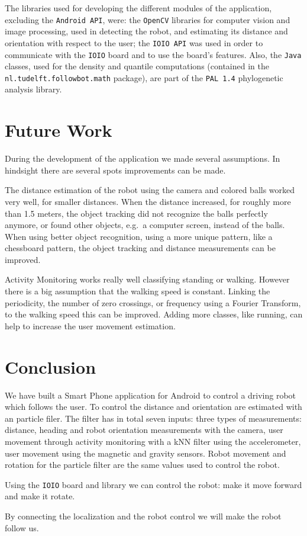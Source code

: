 \documentclass[journal]{IEEEtran}
\begin{document}
The libraries used for developing the different modules of the application, excluding the \texttt{Android API}, were: the \texttt{OpenCV} libraries for computer vision and image processing, used in detecting the robot, and estimating its distance and orientation with respect to the user; the \texttt{IOIO API} was used in order to communicate with the \texttt{IOIO} board and to use the board's features. Also, the \texttt{Java} classes, used for the density and quantile computations (contained in the \texttt{nl.tudelft.followbot.math} package), are part of the \texttt{PAL 1.4} phylogenetic analysis library.

\section{Future Work}

During the development of the application we made several assumptions. In
hindsight there are several spots improvements can be made.

The distance estimation of the robot using the camera and colored balls worked
very well, for smaller distances. When the distance increased, for roughly
more than 1.5 meters, the object tracking did not recognize the balls perfectly
anymore, or found other objects, e.g.\ a computer screen, instead of the balls.
When using better object recognition, using a more unique pattern, like a
chessboard pattern, the object tracking and distance measurements can be improved.

Activity Monitoring works really well classifying standing or walking. However
there is a big assumption that the walking speed is constant. Linking the
periodicity, the number of zero crossings, or frequency using a Fourier
Transform, to the walking speed this can be improved. Adding more classes,
like running, can help to increase the user movement estimation.

\section{Conclusion}

We have built a Smart Phone application for Android to control a driving robot
which follows the user. To control the distance and orientation are estimated
with an particle filer. The filter has in total seven inputs: three types of
measurements: distance, heading and robot orientation measurements with the
camera, user movement through activity monitoring with a kNN filter using
the accelerometer, user movement using the magnetic and gravity sensors. Robot
movement and rotation for the particle filter are the same values used to
control the robot.

Using the \texttt{IOIO} board and library we can control the robot: make it
move forward and make it rotate.

By connecting the localization and the robot control we will make the robot
follow us.




\end{document}

